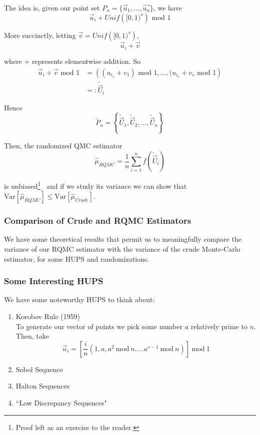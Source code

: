 \documentclass[12pt]{article}
\newlength\tindent
\renewcommand{\indent}{\hspace*{\tindent}}
\newcommand{\var}{\mathrm{Var}}
\renewcommand{\mod}{\mathrm{~mod~}}
\begin{document}
The idea is, given our point set $P_n = \{\vec{u}_1, ..., \vec{u_n}\}$, we have
\begin{equation*}
	\vec{u}_i + Unif\left( [0,1)^s \right) \textrm{ mod } 1
\end{equation*}

More succinctly, letting $\vec{v} = Unif\left( [0,1)^s \right)$,
\begin{equation*}
	\vec{u}_i + \vec{v}
\end{equation*}

where $+$ represents elementwise addition. So
\begin{align*}
	\vec{u}_i + \vec{v} \textrm{ mod } 1 &= \left( (u_{i_1} + v_1) \textrm{ mod } 1, ..., (u_{i_s} + v_s \textrm{ mod } 1 \right) \\
	&=: \tilde{\vec{U}}_i
\end{align*}

Hence
\begin{equation*}
	\tilde{P}_n = \left\{\tilde{\vec{U}}_1, \tilde{\vec{U}}_2, ... ,\tilde{\vec{U}}_n \right\}
\end{equation*}

Then, the randomized QMC estimator
\begin{equation*}
	\hat{\mu}_{RQMC} = \frac{1}{n} \sum^n_{i = 1} f\left( \tilde{\vec{U}}_i \right)
\end{equation*}

is unbiased\footnote{Proof left as an exercise to the reader.}~ and if we study its variance we can show that $\var\left[ \hat{\mu}_{RQMC} \right] \leq \var \left[ \hat{\mu}_{Crude} \right]$.

\subsubsection{Comparison of Crude and RQMC Estimators}

\indent We have some theoretical results that permit us to meaningfully compare the variance of our RQMC estimator with the variance of the crude Monte-Carlo estimator, for some HUPS and randomizations.

\subsubsection{Some Interesting HUPS}
We have some noteworthy HUPS to think about:
\begin{enumerate}
	\item Korobov Rule (1959) \\

\indent To generate our vector of points we pick some number $a$ relatively prime to $n$. Then, take
\begin{equation*}
	\vec{u}_i = \left[ \frac{i}{n} \left(1, a, a^2 \mod n, ... a^{s - 1} \mod n\right)\right] \mod 1
\end{equation*}
	
	\item Sobol Sequence 
	\item Halton Sequences 
	\item ``Low Discrepancy Sequences"
\end{enumerate}
\end{document}
